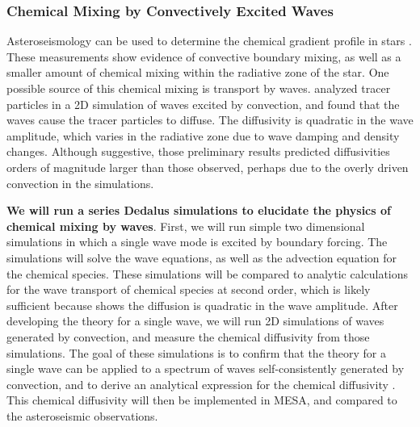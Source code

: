 \subsubsection{Chemical Mixing by Convectively Excited Waves}

Asteroseismology can be used to determine the chemical gradient profile in stars \citep{moravveji:15,moravveji:16,Ghasemi_2016}. These measurements show evidence of convective boundary mixing, as well as a smaller amount of chemical mixing within the radiative zone of the star. One possible source of this chemical mixing is transport by waves. \citet{Rogers2017} analyzed tracer particles in a 2D simulation of waves excited by convection, and found that the waves cause the tracer particles to diffuse. The diffusivity is quadratic in the wave amplitude, which varies in the radiative zone due to wave damping and density changes. Although suggestive, those preliminary results predicted diffusivities orders of magnitude larger than those observed, perhaps due to the overly driven convection in the simulations. 

\textbf{We will run a series Dedalus simulations to elucidate the physics of chemical mixing by waves}. First, we will run simple two dimensional simulations in which a single wave mode is excited by boundary forcing. The simulations will solve the wave equations, as well as the advection equation for the chemical species. These simulations will be compared to analytic calculations for the wave transport of chemical species at second order, which is likely sufficient because \citet{Rogers2017} shows the diffusion is quadratic in the wave amplitude. After developing the theory for a single wave, we will run 2D simulations of waves generated by convection, and measure the chemical diffusivity from those simulations. The goal of these simulations is to confirm that the theory for a single wave can be applied to a spectrum of waves self-consistently generated by convection, and to derive an analytical expression for the chemical diffusivity . This chemical diffusivity will then be implemented in MESA,  and compared to the asteroseismic observations.
